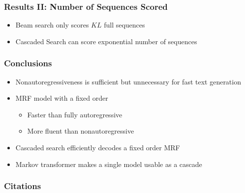 \documentclass{beamer}
\begin{document}
\begin{frame}
\frametitle{Results II: Number of Sequences Scored}
\begin{itemize}
    \item<1-> Beam search only scores $KL$ full sequences
    \item<2-> Cascaded Search can score exponential number of sequences
\end{itemize}
\begin{center}
\end{center}
\end{frame}

\begin{frame}
\frametitle{Conclusions}
\begin{itemize}
    \item<1-> Nonautoregressiveness is sufficient but unnecessary for fast text generation
    \item<2-> MRF model with a fixed order
    \begin{itemize}
        \item Faster than fully autoregressive
        \item More fluent than nonautoregressive
    \end{itemize}
\item<3-> Cascaded search efficiently decodes a fixed order MRF
\item<4-> Markov transformer makes a single model usable as a cascade
\end{itemize}
\end{frame}




\begin{frame}
\frametitle{Citations}


\end{frame}
\end{document}
